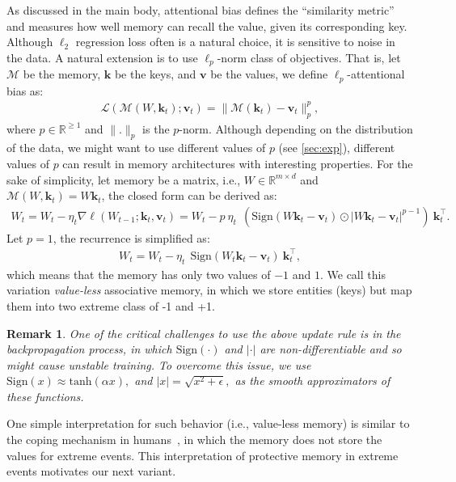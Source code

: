 \documentclass{article}
\newcommand{\citep}{\parencite}
\newcommand{\R}[0]{\mathbb{R}}
\newcommand{\vk}[0]{\mathbf{k}}
\newcommand{\vvv}[0]{\mathbf{v}}
\newcommand{\M}[0]{\mathcal{M}}
\newtheorem{remark}{Remark}
\theoremstyle{plain}
\theoremstyle{definition}
\theoremstyle{remark}
\newcommand{\head}[1]{\vspace{1.7mm}\noindent{{\textcolor{c2}{\bf #1.}}}}
\begin{document}
\head{Variant 1: $\ell_p$-Attentional Bias}
As discussed in the main body, attentional bias defines the ``similarity metric'' and measures how well memory can recall the value, given its corresponding key. Although $\ell_2$ regression loss often is a natural choice, it is sensitive to noise in the data. A natural extension is to use $\ell_p$-norm class of objectives. That is, let $\M$ be the memory, $\vk$ be the keys, and $\vvv$ be the values, we define $\ell_p$-attentional bias as:
\begin{align}
    \mathcal{L}(\M(W, \vk_t); \vvv_t) = \| \M(\vk_t) - \vvv_t \|^p_p,
\end{align}
where $p \in \mathbb{R}^{\geq 1}$ and $\|.\|_p$ is the $p$-norm. Although depending on the distribution of the data, we might want to use different values of $p$ (see \autoref{sec:exp}), different values of $p$ can result in memory architectures with interesting properties. For the sake of simplicity, let memory be a matrix, i.e., $W \in \R^{m \times d}$ and $\M(W, \vk_t) = W \vk_t$, the closed form can be derived as:
\begin{align}\label{eq:lp-attentional-bias}
    W_t = W_t - \eta_t \nabla \ell (W_{t-1}; \vk_t, \vvv_t) = W_t - p \: \eta_t \:\: \left(\mbox{Sign}(W \vk_t - \vvv_t) \odot|W \vk_t - \vvv_t|^{p-1}\right)\:\vk_t^{\top}.
\end{align}
Let $p = 1$, the recurrence is simplified as:
\begin{align}
    W_t =  W_t - \eta_t \:\: \mbox{Sign}(W_t \vk_t - \vvv_t) \:\vk_t^{\top},
\end{align}
which means that the memory has only two values of $-1$ and $1$. We call this variation \emph{value-less} associative memory, in which we store entities (keys) but map them into two extreme class of -1 and +1. 


\begin{remark}
One of the critical challenges to use the above update rule is in the backpropagation process, in which $\mbox{Sign}(\cdot)$ and $|\cdot|$ are non-differentiable and so might cause unstable training. To overcome this issue, we use $\mbox{Sign}(x) \approx \mbox{tanh}\left( \alpha x \right),$ and $|x| = \sqrt{x^2 + \epsilon},$ as the smooth approximators of these functions.  
\end{remark}

One simple interpretation for such behavior (i.e., value-less memory) is similar to the coping mechanism in humans~\citep{loftus1993reality}, in which the memory does not store the values for extreme events. This interpretation of protective memory in extreme events motivates our next variant.  
\end{document}
